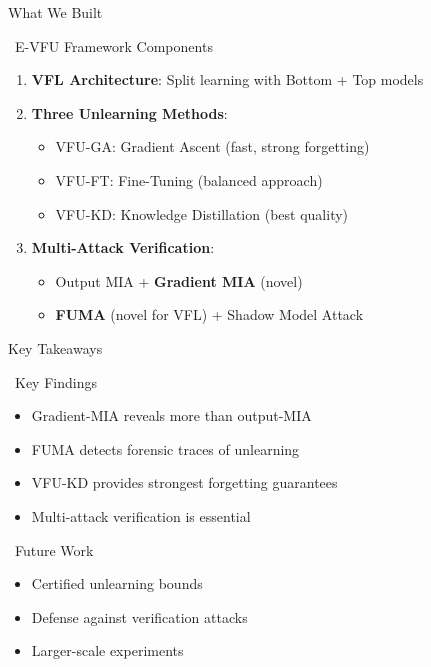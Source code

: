 \documentclass[aspectratio=169, 11pt]{beamer}
\begin{document}
\begin{frame}{What We Built}
    \begin{block}{\faCode\ E-VFU Framework Components}
        \begin{enumerate}
            \item \textbf{VFL Architecture}: Split learning with Bottom + Top models
            \item \textbf{Three Unlearning Methods}:
            \begin{itemize}
                \item VFU-GA: Gradient Ascent (fast, strong forgetting)
                \item VFU-FT: Fine-Tuning (balanced approach)
                \item VFU-KD: Knowledge Distillation (best quality)
            \end{itemize}
            \item \textbf{Multi-Attack Verification}:
            \begin{itemize}
                \item Output MIA + \textbf{Gradient MIA} (novel)
                \item \textbf{FUMA} (novel for VFL) + Shadow Model Attack
            \end{itemize}
        \end{enumerate}
    \end{block}
\end{frame}

\begin{frame}{Key Takeaways}
    \begin{exampleblock}{\faLightbulb\ Key Findings}
        \begin{itemize}
            \item Gradient-MIA reveals more than output-MIA
            \item FUMA detects forensic traces of unlearning
            \item VFU-KD provides strongest forgetting guarantees
            \item Multi-attack verification is essential
        \end{itemize}
    \end{exampleblock}
    
    \vspace{1em}
    \begin{alertblock}{\faRoad\ Future Work}
        \begin{itemize}
            \item Certified unlearning bounds
            \item Defense against verification attacks
            \item Larger-scale experiments
        \end{itemize}
    \end{alertblock}
\end{frame}
\end{document}

